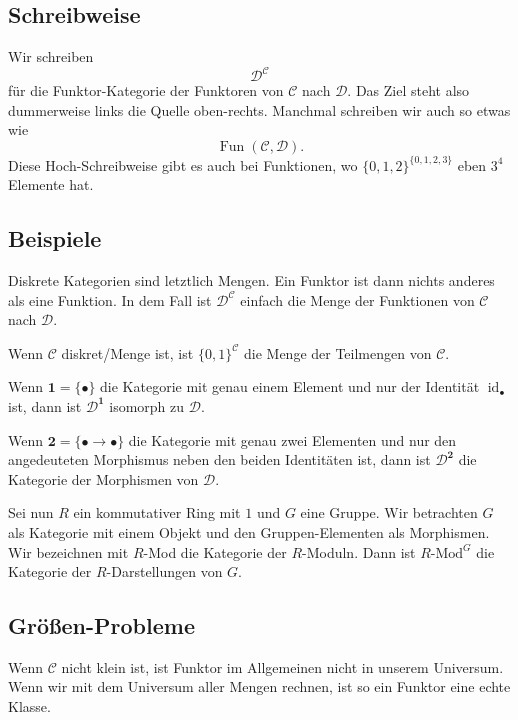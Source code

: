 \documentclass[a4paper]{amsart}
\theoremstyle{definition}
\DeclareMathOperator{\id}{id}
\newcommand{\CC}{\ensuremath{\mathcal{ C }}}
\newcommand{\DD}{\ensuremath{\mathcal{ D }}}
\begin{document}
\subsection{Schreibweise}
Wir schreiben 
\begin{equation}
   \DD^\CC
\end{equation}
für die Funktor-Kategorie der Funktoren von $\CC$ nach $\DD$. Das Ziel steht also dummerweise links die Quelle oben-rechts.
Manchmal schreiben wir auch so etwas wie
\begin{equation}
   \operatorname{Fun}( \CC, \DD).
\end{equation}
Diese Hoch-Schreibweise gibt es auch bei Funktionen, wo $\{0,1,2\}^{\{0,1,2,3\}}$ eben $3^4$ Elemente hat.

\subsection{Beispiele}

Diskrete Kategorien sind letztlich Mengen. Ein Funktor ist dann nichts anderes als eine Funktion. In dem Fall ist $\DD^\CC$ einfach die Menge der Funktionen von $\CC$ nach $\DD$.

Wenn $\CC$ diskret/Menge ist, ist $\{0,1\}^\CC$ die Menge der Teilmengen von $\CC$.

Wenn $\boldsymbol 1 = \{ \bullet \}$ die Kategorie mit genau einem Element und nur der Identität $\id_\bullet$ ist, dann ist $\DD^{\boldsymbol{1}}$ isomorph zu $\DD$.

Wenn $\boldsymbol 2 = \{ \bullet \to \bullet \}$ die Kategorie mit genau zwei Elementen und nur den angedeuteten Morphismus neben den beiden Identitäten ist, dann ist $\DD^{\boldsymbol{2}}$ die Kategorie der Morphismen von $\DD$.

Sei nun $R$ ein kommutativer Ring mit $1$ und $G$ eine Gruppe. Wir betrachten $G$ als Kategorie mit einem Objekt und den Gruppen-Elementen als Morphismen. Wir bezeichnen mit $R$-Mod die Kategorie der $R$-Moduln. Dann ist $\text{$R$-Mod}^G$ die Kategorie der $R$-Darstellungen von $G$.

\subsection{Größen-Probleme}
Wenn $\CC$ nicht klein ist, ist Funktor im Allgemeinen nicht in unserem Universum. Wenn wir mit dem Universum aller Mengen rechnen, ist so ein Funktor eine echte Klasse.
\end{document}
